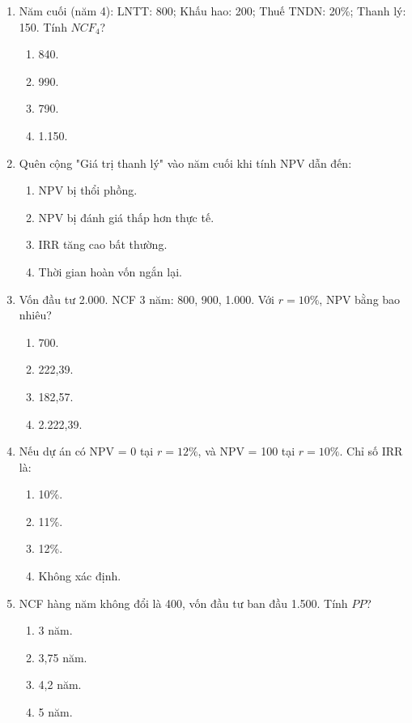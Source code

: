 \begin{enumerate}[label=\textbf{Câu \arabic*:}, leftmargin=*, resume]

\item Năm cuối (năm 4): LNTT: 800; Khấu hao: 200; Thuế TNDN: 20\%; Thanh lý: 150. Tính $NCF_4$?
\begin{enumerate}[label=\Alph*.]
    \item 840. \item 990. \item 790. \item 1.150.
\end{enumerate}

\item Quên cộng "Giá trị thanh lý" vào năm cuối khi tính NPV dẫn đến:
\begin{enumerate}[label=\Alph*.]
    \item NPV bị thổi phồng.
    \item NPV bị đánh giá thấp hơn thực tế.
    \item IRR tăng cao bất thường.
    \item Thời gian hoàn vốn ngắn lại.
\end{enumerate}

\item Vốn đầu tư 2.000. NCF 3 năm: 800, 900, 1.000. Với $r=10\%$, NPV bằng bao nhiêu?
\begin{enumerate}[label=\Alph*.]
    \item 700. \item 222,39. \item 182,57. \item 2.222,39.
\end{enumerate}

\item Nếu dự án có NPV = 0 tại $r = 12\%$, và NPV = 100 tại $r = 10\%$. Chỉ số IRR là:
\begin{enumerate}[label=\Alph*.]
    \item 10\%. \item 11\%. \item 12\%. \item Không xác định.
\end{enumerate}

\item NCF hàng năm không đổi là 400, vốn đầu tư ban đầu 1.500. Tính $PP$?
\begin{enumerate}[label=\Alph*.]
    \item 3 năm. \item 3,75 năm. \item 4,2 năm. \item 5 năm.
\end{enumerate}


\end{enumerate}
